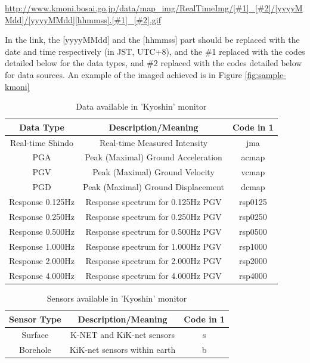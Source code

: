 \documentclass[10pt]{article}
\begin{document}
\begin{center}
    \url{http://www.kmoni.bosai.go.jp/data/map_img/RealTimeImg/[#1]_[#2]/[yyyyMMdd]/[yyyyMMdd][hhmmss].[#1]_[#2].gif}
\end{center}

In the link, the [yyyyMMdd] and the [hhmmss] part should be replaced with the date and time respectively (in JST, UTC+8), and the \#1 replaced with the codes detailed below for the data types, and \#2 replaced with the codes detailed below for data sources. An example of the imaged achieved is in Figure \ref{fig:sample-kmoni}

\begin{table}[!ht]
    \centering

    \begin{tabular}{|c|c|c|}
        \hline
        Data Type        & Description/Meaning                & Code in \@1 \\
        \hline
        Real-time Shindo & Real-time Measured Intensity       & jma         \\
        PGA              & Peak (Maximal) Ground Acceleration & acmap       \\
        PGV              & Peak (Maximal) Ground Velocity     & vcmap       \\
        PGD              & Peak (Maximal) Ground Displacement & dcmap       \\
        Response 0.125Hz & Response spectrum for 0.125Hz PGV  & rsp0125     \\
        Response 0.250Hz & Response spectrum for 0.250Hz PGV  & rsp0250     \\
        Response 0.500Hz & Response spectrum for 0.500Hz PGV  & rsp0500     \\
        Response 1.000Hz & Response spectrum for 1.000Hz PGV  & rsp1000     \\
        Response 2.000Hz & Response spectrum for 2.000Hz PGV  & rsp2000     \\
        Response 4.000Hz & Response spectrum for 4.000Hz PGV  & rsp4000     \\
        \hline
    \end{tabular}
    \caption{Data available in 'Kyoshin' monitor}
    \label{table:kmoni-data-types}
\end{table}

\begin{table}[!ht]
    \centering

    \begin{tabular}{|c|c|c|}
        \hline
        Sensor Type & Description/Meaning          & Code in \@1 \\
        \hline
        Surface     & K-NET and KiK-net sensors    & s           \\
        Borehole    & KiK-net sensors within earth & b           \\
        \hline
    \end{tabular}
    \caption{Sensors available in 'Kyoshin' monitor}
    \label{table:kmoni-sensor-types}
\end{table}
\end{document}
